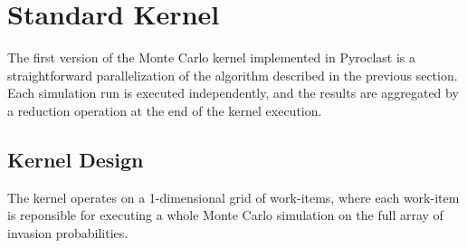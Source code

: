 \section{Standard Kernel}\label{sec:standard_kernel}
The first version of the Monte Carlo kernel implemented in Pyroclast is a straightforward parallelization of the algorithm described in the previous section. Each simulation run is executed independently, and the results are aggregated by a reduction operation at the end of the kernel execution.

\subsection{Kernel Design}\label{subsec:kernel_design}
The kernel operates on a 1-dimensional grid of work-items, where each work-item is reponsible for executing a whole Monte Carlo simulation on the full array of invasion probabilities.

